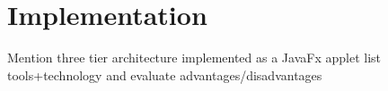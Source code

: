 \chapter{Implementation}
Mention three tier architecture
implemented as a JavaFx applet
list tools+technology and evaluate advantages/disadvantages